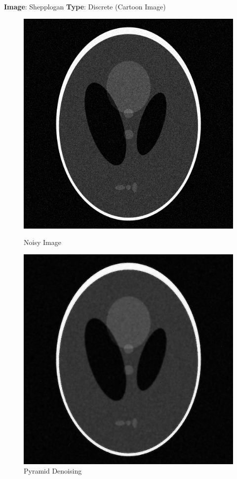 \documentclass{article}
\begin{document}
    
    \pagebreak
    \textbf{Image}: Shepplogan  \textbf{Type}: Discrete (Cartoon Image)\\
    
    \begin{figure}[!htb]
      \includegraphics[scale=0.4]{./denoising/n/n05.png}
      \caption{Noisy Image}
    \endminipage \hfill
      \includegraphics[scale=.4]{./denoising/n/p_1_0_013.png}
      \caption{Pyramid Denoising}
    \endminipage
    \end{figure}
    
\end{document}
